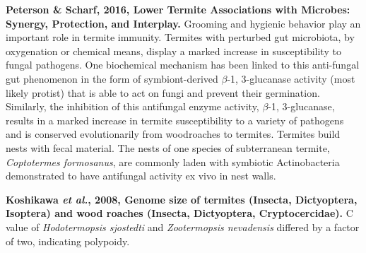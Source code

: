 \documentclass[11pt]{article}
\begin{document}
\begin{sloppypar}
\par
\textbf{Peterson & Scharf, 2016, Lower Termite Associations with Microbes: Synergy, Protection, and Interplay.} \newline
Grooming and hygienic behavior play an important role in termite immunity. 
Termites with perturbed gut microbiota, by oxygenation or chemical means, display a marked increase in susceptibility to fungal pathogens. 
One biochemical mechanism has been linked to this anti-fungal gut phenomenon in the form of symbiont-derived $\beta$-1, 3-glucanase activity (most likely protist) that is able to act on fungi and prevent their germination. 
Similarly, the inhibition of this antifungal enzyme activity, $\beta$-1, 3-glucanase, results in a marked increase in termite susceptibility to a variety of pathogens and is conserved evolutionarily from woodroaches to termites. 
Termites build nests with fecal material. 
The nests of one species of subterranean termite, \textit{Coptotermes formosanus}, are commonly laden with symbiotic Actinobacteria demonstrated to have antifungal activity ex vivo in nest walls.
\par
\textbf{Koshikawa \textit{et al.}, 2008, Genome size of termites (Insecta, Dictyoptera, Isoptera) and wood roaches (Insecta, Dictyoptera, Cryptocercidae).} \newline
C value of \textit{Hodotermopsis sjostedti} and \textit{Zootermopsis nevadensis} differed by a factor of two, indicating polypoidy.


\end{sloppypar}
\end{document}
